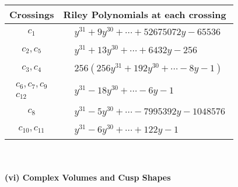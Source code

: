 \documentclass[1p]{elsarticle_modified}
\theoremstyle{definition}
\begin{document}
\begin{tabular}{m{50pt}|m{274pt}}
Crossings & \hspace{64pt}Riley Polynomials at each crossing \\
\hline $$\begin{aligned}c_{1}\end{aligned}$$&$\begin{aligned}
&y^{31}+9 y^{30}+\cdots+52675072 y-65536
\end{aligned}$\\
\hline $$\begin{aligned}c_{2},c_{5}\end{aligned}$$&$\begin{aligned}
&y^{31}+13 y^{30}+\cdots+6432 y-256
\end{aligned}$\\
\hline $$\begin{aligned}c_{3},c_{4}\end{aligned}$$&$\begin{aligned}
&256(256 y^{31}+192 y^{30}+\cdots-8 y-1)
\end{aligned}$\\
\hline $$\begin{aligned}c_{6},c_{7},c_{9}\\c_{12}\end{aligned}$$&$\begin{aligned}
&y^{31}-18 y^{30}+\cdots-6 y-1
\end{aligned}$\\
\hline $$\begin{aligned}c_{8}\end{aligned}$$&$\begin{aligned}
&y^{31}-5 y^{30}+\cdots-7995392 y-1048576
\end{aligned}$\\
\hline $$\begin{aligned}c_{10},c_{11}\end{aligned}$$&$\begin{aligned}
&y^{31}-6 y^{30}+\cdots+122 y-1
\end{aligned}$\\
\hline
\end{tabular}\\~\\
\newpage\flushleft \textbf{(vi) Complex Volumes and Cusp Shapes}
\end{document}
